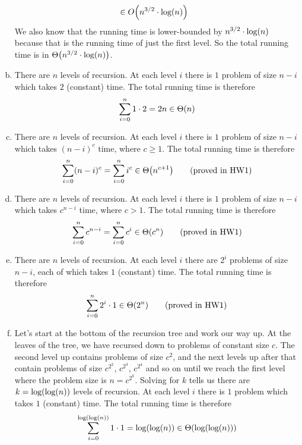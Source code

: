 \documentclass[11pt]{article}
\let\origleft\left
\let\origright\right
\renewcommand{\left}{\mathopen{}\mathclose\bgroup\origleft}
\renewcommand{\right}{\aftergroup\egroup\origright}
\newcommand{\p}[1]{\left(#1\right)}
\renewcommand{\log}[1]{\text{log}\p{#1}}
\newcommand{\BigOh}[1]{O\p{#1}}
\newcommand{\BigTheta}[1]{\Theta\p{#1}}
\begin{document}
\begin{enumerate}[(a)]
\begin{align*}
&\in \BigOh{n^{3/2}\cdot\log n}
\end{align*}
We also know that the running time is lower-bounded by $n^{3/2}\cdot \log n$ because that is the running time of just the first level. So the total running time is in $\BigTheta{n^{3/2}\cdot\log n}$.
\item There are $n$ levels of recursion. At each level $i$ there is $1$ problem of size $n-i$ which takes $2$ (constant) time. The total running time is therefore $$\sum_{i=0}^n 1\cdot 2 = 2n \in \BigTheta{n}$$
\item There are $n$ levels of recursion. At each level $i$ there is $1$ problem of size $n-i$ which takes $(n-i)^c$ time, where $c\geq 1$. The total running time is therefore $$\sum_{i=0}^n (n-i)^c = \sum_{i=0}^n i^c \in \BigTheta{n^{c+1}} \qquad \text{(proved in HW1)}$$
\item There are $n$ levels of recursion. At each level $i$ there is $1$ problem of size $n-i$ which takes $c^{n-i}$ time, where $c>1$. The total running time is therefore $$\sum_{i=0}^n c^{n-i} = \sum_{i=0}^n c^i \in \BigTheta{c^n} \qquad \text{(proved in HW1)}$$
\item There are $n$ levels of recursion. At each level $i$ there are $2^i$ problems of size $n-i$, each of which takes $1$ (constant) time. The total running time is therefore $$\sum_{i=0}^n 2^i\cdot 1 \in \BigTheta{2^n} \qquad \text{(proved in HW1)}$$
\item Let's start at the bottom of the recursion tree and work our way up. At the leaves of the tree, we have recursed down to problems of constant size $c$. The second level up contains problems of size $c^2$, and the next levels up after that contain problems of size $c^{2^2}$, $c^{2^3}$, $c^{2^4}$ and so on until we reach the first level where the problem size is $n=c^{2^k}$. Solving for $k$ tells us there are $k=\log{\log n}$ levels of recursion. At each level $i$ there is $1$ problem which takes $1$ (constant) time. The total running time is therefore $$\sum_{i=0}^{\log{\log n}} 1\cdot 1 = \log{\log n} \in \BigTheta{\log{\log n}}$$
\end{enumerate}


\newpage
\end{document}
